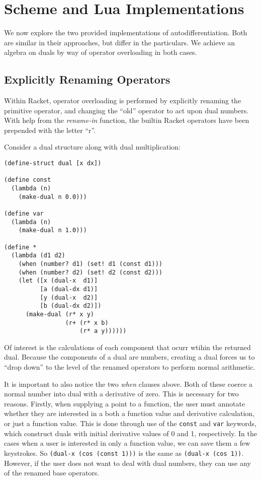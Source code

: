 \documentclass{article}
\begin{document}
\section{Scheme and Lua Implementations}
We now explore the two provided implementations of autodifferentiation.  Both
are similar in their approaches, but differ in the particulars.  We achieve an
algebra on duals by way of operator overloading in both cases.

\subsection{Explicitly Renaming Operators}
Within Racket, operator overloading is performed by explicitly renaming the
primitive operator, and changing the ``old'' operator to act upon dual numbers.
With help from the \textit{rename-in} function, the builtin Racket operators
have been prepended with the letter ``r''.

Consider a dual structure along with dual multiplication:
\begin{lstlisting}
(define-struct dual [x dx])

(define const
  (lambda (n)
    (make-dual n 0.0)))

(define var
  (lambda (n)
    (make-dual n 1.0)))

(define *
  (lambda (d1 d2)
    (when (number? d1) (set! d1 (const d1)))
    (when (number? d2) (set! d2 (const d2)))
    (let ([x (dual-x  d1)]
          [a (dual-dx d1)]
          [y (dual-x  d2)]
          [b (dual-dx d2)])
      (make-dual (r* x y)
                 (r+ (r* x b)
                     (r* a y))))))
\end{lstlisting}

Of interest is the calculations of each component that ocurr wtihin the returned
dual.  Because the components of a dual are numbers, creating a dual forces us
to ``drop down'' to the level of the renamed operators to perform normal
arithmetic.

It is important to also notice the two \textit{when} clauses above.  Both of
these coerce a normal number into dual with a derivative of zero.  This is
necessary for two reasons.  Firstly, when supplying a point to a function, the
user must annotate whether they are interested in a both a function value and
derivative calculation, or just a function value.  This is done through use of
the \texttt{const} and \texttt{var} keywords, which construct duals with initial
derivative values of 0 and 1, respectively.  In the cases when a user is
interested in only a function value, we can save them a few keystrokes.  So
\texttt{(dual-x (cos (const 1)))} is the same as \lstinline{(dual-x (cos 1))}.
However, if the user does not want to deal with dual numbers, they can use any
of the renamed base operators.
\end{document}

